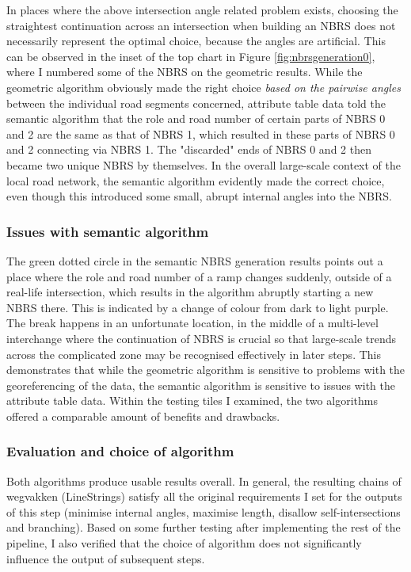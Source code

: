 In places where the above intersection angle related problem exists, choosing the straightest continuation across an intersection when building an NBRS does not necessarily represent the optimal choice, because the angles are artificial. This can be observed in the inset of the top chart in Figure \ref{fig:nbrsgeneration0}, where I numbered some of the NBRS on the geometric results. While the geometric algorithm obviously made the right choice \textit{based on the pairwise angles} between the individual road segments concerned, attribute table data told the semantic algorithm that the role and road number of certain parts of NBRS 0 and 2 are the same as that of NBRS 1, which resulted in these parts of NBRS 0 and 2 connecting via NBRS 1. The "discarded" ends of NBRS 0 and 2 then became two unique NBRS by themselves. In the overall large-scale context of the local road network, the semantic algorithm evidently made the correct choice, even though this introduced some small, abrupt internal angles into the NBRS.

\subsubsection{Issues with semantic algorithm}

The green dotted circle in the semantic NBRS generation results points out a place where the role and road number of a ramp changes suddenly, outside of a real-life intersection, which results in the algorithm abruptly starting a new NBRS there. This is indicated by a change of colour from dark to light purple. The break happens in an unfortunate location, in the middle of a multi-level interchange where the continuation of NBRS is crucial so that large-scale trends across the complicated zone may be recognised effectively in later steps. This demonstrates that while the geometric algorithm is sensitive to problems with the georeferencing of the data, the semantic algorithm is sensitive to issues with the attribute table data. Within the testing tiles I examined, the two algorithms offered a comparable amount of benefits and drawbacks.

\subsubsection{Evaluation and choice of algorithm}

Both algorithms produce usable results overall. In general, the resulting chains of wegvakken (LineStrings) satisfy all the original requirements I set for the outputs of this step (minimise internal angles, maximise length, disallow self-intersections and branching). Based on some further testing after implementing the rest of the pipeline, I also verified that the choice of algorithm does not significantly influence the output of subsequent steps.

